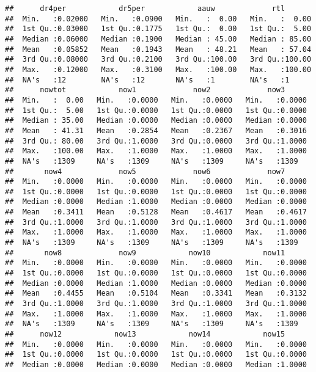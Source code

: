 \documentclass[
]{article}
\begin{document}
\begin{verbatim}
##      dr4per            dr5per            aauw             rtl        
##  Min.   :0.02000   Min.   :0.0900   Min.   :  0.00   Min.   :  0.00  
##  1st Qu.:0.03000   1st Qu.:0.1775   1st Qu.:  0.00   1st Qu.:  5.00  
##  Median :0.06000   Median :0.1900   Median : 45.00   Median : 85.00  
##  Mean   :0.05852   Mean   :0.1943   Mean   : 48.21   Mean   : 57.04  
##  3rd Qu.:0.08000   3rd Qu.:0.2100   3rd Qu.:100.00   3rd Qu.:100.00  
##  Max.   :0.12000   Max.   :0.3100   Max.   :100.00   Max.   :100.00  
##  NA's   :12        NA's   :12       NA's   :1        NA's   :1       
##      nowtot            now1             now2             now3       
##  Min.   :  0.00   Min.   :0.0000   Min.   :0.0000   Min.   :0.0000  
##  1st Qu.:  5.00   1st Qu.:0.0000   1st Qu.:0.0000   1st Qu.:0.0000  
##  Median : 35.00   Median :0.0000   Median :0.0000   Median :0.0000  
##  Mean   : 41.31   Mean   :0.2854   Mean   :0.2367   Mean   :0.3016  
##  3rd Qu.: 80.00   3rd Qu.:1.0000   3rd Qu.:0.0000   3rd Qu.:1.0000  
##  Max.   :100.00   Max.   :1.0000   Max.   :1.0000   Max.   :1.0000  
##  NA's   :1309     NA's   :1309     NA's   :1309     NA's   :1309    
##       now4             now5             now6             now7       
##  Min.   :0.0000   Min.   :0.0000   Min.   :0.0000   Min.   :0.0000  
##  1st Qu.:0.0000   1st Qu.:0.0000   1st Qu.:0.0000   1st Qu.:0.0000  
##  Median :0.0000   Median :1.0000   Median :0.0000   Median :0.0000  
##  Mean   :0.3411   Mean   :0.5128   Mean   :0.4617   Mean   :0.4617  
##  3rd Qu.:1.0000   3rd Qu.:1.0000   3rd Qu.:1.0000   3rd Qu.:1.0000  
##  Max.   :1.0000   Max.   :1.0000   Max.   :1.0000   Max.   :1.0000  
##  NA's   :1309     NA's   :1309     NA's   :1309     NA's   :1309    
##       now8             now9            now10            now11       
##  Min.   :0.0000   Min.   :0.0000   Min.   :0.0000   Min.   :0.0000  
##  1st Qu.:0.0000   1st Qu.:0.0000   1st Qu.:0.0000   1st Qu.:0.0000  
##  Median :0.0000   Median :1.0000   Median :0.0000   Median :0.0000  
##  Mean   :0.4455   Mean   :0.5104   Mean   :0.3341   Mean   :0.3132  
##  3rd Qu.:1.0000   3rd Qu.:1.0000   3rd Qu.:1.0000   3rd Qu.:1.0000  
##  Max.   :1.0000   Max.   :1.0000   Max.   :1.0000   Max.   :1.0000  
##  NA's   :1309     NA's   :1309     NA's   :1309     NA's   :1309    
##      now12            now13            now14            now15       
##  Min.   :0.0000   Min.   :0.0000   Min.   :0.0000   Min.   :0.0000  
##  1st Qu.:0.0000   1st Qu.:0.0000   1st Qu.:0.0000   1st Qu.:0.0000  
##  Median :0.0000   Median :0.0000   Median :0.0000   Median :1.0000  

\end{verbatim}
\end{document}
